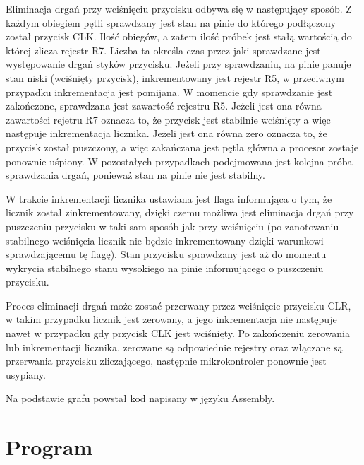 \documentclass[fleqn]{article}
\begin{document}
Eliminacja drgań przy wciśnięciu przycisku odbywa się w następujący sposób. Z każdym obiegiem pętli sprawdzany jest stan na pinie do którego podłączony został przycisk CLK. Ilość obiegów, a zatem ilość próbek jest stałą wartością do której zlicza rejestr R7. Liczba ta określa czas przez jaki sprawdzane jest występowanie drgań styków przycisku. Jeżeli przy sprawdzaniu, na pinie panuje stan niski (wciśnięty przycisk), inkrementowany jest rejestr R5, w przeciwnym przypadku inkrementacja jest pomijana. W momencie gdy sprawdzanie jest zakończone, sprawdzana jest zawartość rejestru R5. Jeżeli jest ona równa zawartości rejetru R7 oznacza to, że przycisk jest stabilnie wciśnięty a więc następuje inkrementacja licznika. Jeżeli jest ona równa zero oznacza to, że przycisk został puszczony, a więc zakańczana jest pętla główna a procesor zostaje ponownie uśpiony. W pozostałych przypadkach podejmowana jest kolejna próba sprawdzania drgań, ponieważ stan na pinie nie jest stabilny.

W trakcie inkrementacji licznika ustawiana jest flaga informująca o tym, że licznik został zinkrementowany, dzięki czemu możliwa jest eliminacja drgań przy puszczeniu przycisku w taki sam sposób jak przy wciśnięciu (po zanotowaniu stabilnego wciśnięcia licznik nie będzie inkrementowany dzięki warunkowi sprawdzającemu tę flagę). Stan przycisku sprawdzany jest aż do momentu wykrycia stabilnego stanu wysokiego na pinie informującego o puszczeniu przycisku.

Proces eliminacji drgań może zostać przerwany przez wciśnięcie przycisku CLR, w takim przypadku licznik jest zerowany, a jego inkrementacja nie następuje nawet w przypadku gdy przycisk CLK jest wciśnięty. Po zakończeniu zerowania lub inkrementacji licznika, zerowane są odpowiednie rejestry oraz włączane są przerwania przycisku zliczającego, następnie mikrokontroler ponownie jest usypiany.

Na podstawie grafu powstał kod napisany w języku Assembly.

\pagebreak

\section{Program}
\end{document}
